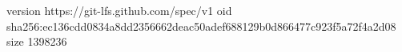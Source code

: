 version https://git-lfs.github.com/spec/v1
oid sha256:ec136cdd0834a8dd2356662deac50adef688129b0d866477c923f5a72f4a2d08
size 1398236
